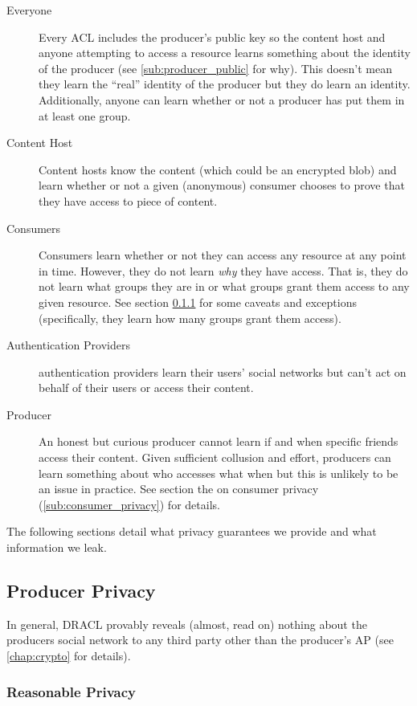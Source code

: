\documentclass[pdftex,12pt,a4papaer,twoside,notitlepage]{report}
\begin{document}
\begin{description}
\item[Everyone] Every ACL includes the producer's public key so the content host
  and anyone attempting to access a resource learns something about the identity
  of the producer (see \cref{sub:producer_public} for why). This doesn't mean
  they learn the ``real'' identity of the producer but they do learn an
  identity. Additionally, anyone can learn whether or not a producer has put
  them in at least one group.
\item[Content Host] Content hosts know the content (which could be an encrypted
  blob) and learn whether or not a given (anonymous) consumer chooses to prove
  that they have access to piece of content.
\item[Consumers] Consumers learn whether or not they can access any resource at
  any point in time. However, they do not learn \emph{why} they have access.
  That is, they do not learn what groups they are in or what groups grant them
  access to any given resource. See section \cref{sub:resonable_privacy} for
  some caveats and exceptions (specifically, they learn how many groups grant
  them access).
\item[Authentication Providers] authentication providers learn their users'
  social networks but can't act on behalf of their users or access their
  content.
\item[Producer] An honest but curious producer cannot learn if and when specific
  friends access their content. Given sufficient collusion and effort, producers
  can learn something about who accesses what when but this is unlikely to be an
  issue in practice. See section the on consumer privacy
  (\cref{sub:consumer_privacy}) for details.
\end{description}

The following sections detail what privacy guarantees we provide and what
information we leak.

\subsection{Producer Privacy}
\label{sub:producer_privacy}

In general, DRACL provably reveals (almost, read on) nothing about the producers
social network to any third party other than the producer's AP (see
\cref{chap:crypto} for details).

\subsubsection{Reasonable Privacy}
\label{sub:resonable_privacy}
\end{document}

